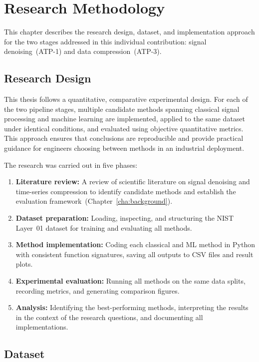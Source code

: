 \chapter{Research Methodology}
\label{cha:methodology}

This chapter describes the research design, dataset, and implementation approach for the two stages addressed in this individual contribution: signal denoising~(ATP-1) and data compression~(ATP-3).

\section{Research Design}
\label{sec:research_design}

This thesis follows a quantitative, comparative experimental design. For each of the two pipeline stages, multiple candidate methods spanning classical signal processing and machine learning are implemented, applied to the same dataset under identical conditions, and evaluated using objective quantitative metrics. This approach ensures that conclusions are reproducible and provide practical guidance for engineers choosing between methods in an industrial deployment.

The research was carried out in five phases:

\begin{enumerate}[leftmargin=2em]
\item \textbf{Literature review:} A review of scientific literature on signal denoising and time-series compression to identify candidate methods and establish the evaluation framework~(Chapter~\ref{cha:background}).
\item \textbf{Dataset preparation:} Loading, inspecting, and structuring the NIST Layer~01 dataset for training and evaluating all methods.
\item \textbf{Method implementation:} Coding each classical and ML method in Python with consistent function signatures, saving all outputs to CSV files and result plots.
\item \textbf{Experimental evaluation:} Running all methods on the same data splits, recording metrics, and generating comparison figures.
\item \textbf{Analysis:} Identifying the best-performing methods, interpreting the results in the context of the research questions, and documenting all implementations.
\end{enumerate}

\section{Dataset}
\label{sec:dataset}

